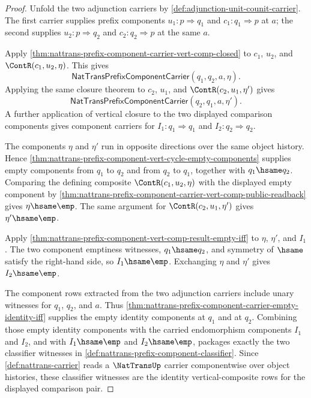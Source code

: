 \begin{proof}
Unfold the two adjunction carriers by \autoref{def:adjunction-unit-counit-carrier}. The first carrier supplies prefix components $u_1:p\Rightarrow q_1$ and $c_1:q_1\Rightarrow p$ at $a$; the second supplies $u_2:p\Rightarrow q_2$ and $c_2:q_2\Rightarrow p$ at the same $a$.

Apply \autoref{thm:nattrans-prefix-component-carrier-vert-comp-closed} to $c_1$, $u_2$, and $\ContR(c_1,u_2,\eta)$. This gives
$$
\mathsf{NatTransPrefixComponentCarrier}(q_1,q_2,a,\eta).
$$
Applying the same closure theorem to $c_2$, $u_1$, and $\ContR(c_2,u_1,\eta')$ gives
$$
\mathsf{NatTransPrefixComponentCarrier}(q_2,q_1,a,\eta').
$$
A further application of vertical closure to the two displayed comparison components gives component carriers for $I_1:q_1\Rightarrow q_1$ and $I_2:q_2\Rightarrow q_2$.

The components $\eta$ and $\eta'$ run in opposite directions over the same object history. Hence \autoref{thm:nattrans-prefix-component-vert-cycle-empty-components} supplies empty components from $q_1$ to $q_2$ and from $q_2$ to $q_1$, together with $q_1\hsame q_2$. Comparing the defining composite $\ContR(c_1,u_2,\eta)$ with the displayed empty component by \autoref{thm:nattrans-prefix-component-carrier-vert-comp-public-readback} gives $\eta\hsame\emp$. The same argument for $\ContR(c_2,u_1,\eta')$ gives $\eta'\hsame\emp$.

Apply \autoref{thm:nattrans-prefix-component-vert-comp-result-empty-iff} to $\eta$, $\eta'$, and $I_1$. The two component emptiness witnesses, $q_1\hsame q_2$, and symmetry of $\hsame$ satisfy the right-hand side, so $I_1\hsame\emp$. Exchanging $\eta$ and $\eta'$ gives $I_2\hsame\emp$.

The component rows extracted from the two adjunction carriers include unary witnesses for $q_1$, $q_2$, and $a$. Thus \autoref{thm:nattrans-prefix-component-carrier-empty-identity-iff} supplies the empty identity components at $q_1$ and at $q_2$. Combining those empty identity components with the carried endomorphism components $I_1$ and $I_2$, and with $I_1\hsame\emp$ and $I_2\hsame\emp$, packages exactly the two classifier witnesses in \autoref{def:nattrans-prefix-component-classifier}. Since \autoref{def:nattrans-carrier} reads a $\NatTransUp$ carrier componentwise over object histories, these classifier witnesses are the identity vertical-composite rows for the displayed comparison pair.
\end{proof}

